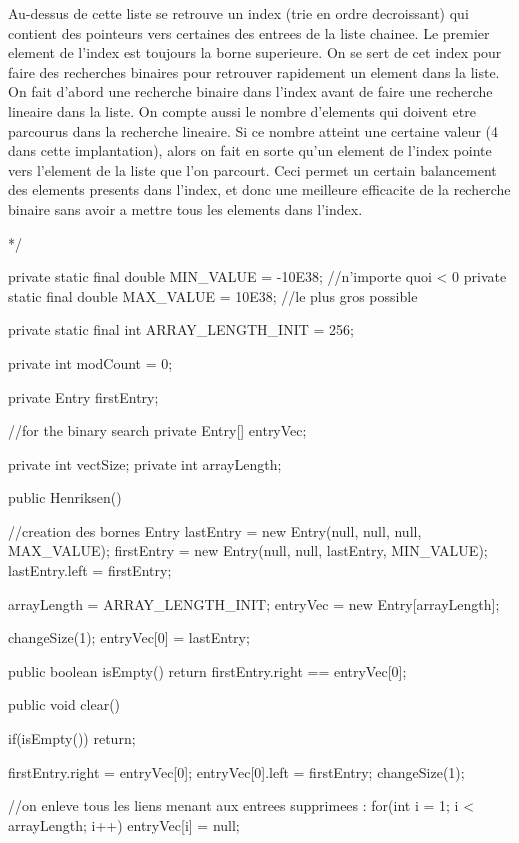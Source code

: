 \begin{code}
\begin{hide}
{     Au-dessus de cette liste se retrouve un index (trie en ordre decroissant)
     qui contient des pointeurs vers certaines des entrees de la liste
     chainee. Le premier element de l'index est toujours la borne superieure.
     On se sert de cet index pour faire des recherches binaires pour
     retrouver rapidement un element dans la liste. On fait d'abord une
     recherche binaire dans l'index avant de faire une recherche lineaire
     dans la liste. On compte aussi le nombre d'elements qui doivent etre
     parcourus dans la recherche lineaire. Si ce nombre atteint une certaine
     valeur (4 dans cette implantation), alors on fait en sorte qu'un
     element de l'index pointe vers l'element de la liste que l'on parcourt.
     Ceci permet un certain balancement des elements presents dans l'index,
     et donc une meilleure efficacite de la recherche binaire sans avoir
     a mettre tous les elements dans l'index.

   */

   private static final double MIN_VALUE = -10E38; //n'importe quoi < 0
   private static final double MAX_VALUE = 10E38;  //le plus gros possible

   private static final int ARRAY_LENGTH_INIT = 256;


   private int modCount = 0;

   private Entry firstEntry;

   //for the binary search
   private Entry[] entryVec;

   private int vectSize;
   private int arrayLength;


   public Henriksen() {
      //creation des bornes
      Entry lastEntry = new Entry(null, null, null, MAX_VALUE);
      firstEntry = new Entry(null, null, lastEntry, MIN_VALUE);
      lastEntry.left = firstEntry;

      arrayLength = ARRAY_LENGTH_INIT;
      entryVec = new Entry[arrayLength];

      changeSize(1);
      entryVec[0] = lastEntry;
   }

   public boolean isEmpty() {
      return firstEntry.right == entryVec[0];
   }

   public void clear() {
      if(isEmpty())
         return;

      firstEntry.right = entryVec[0];
      entryVec[0].left = firstEntry;
      changeSize(1);

      //on enleve tous les liens menant aux entrees supprimees :
      for(int i = 1; i < arrayLength; i++)
         entryVec[i] = null;

}}
\end{hide}
\end{code}
